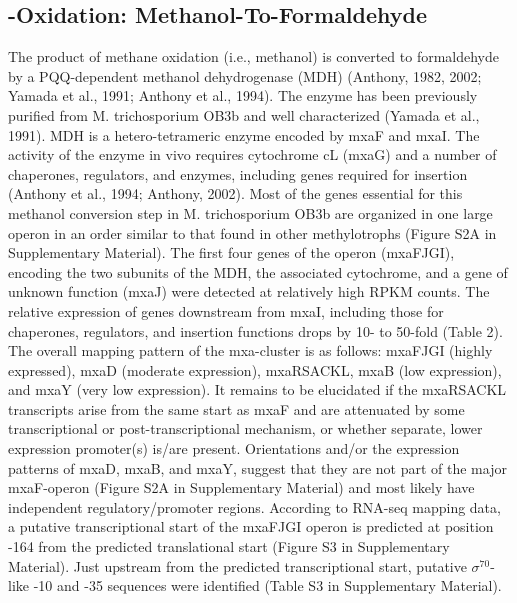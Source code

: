 \subsection{-Oxidation: Methanol-To-Formaldehyde}
The product of methane oxidation (i.e., methanol) is converted to formaldehyde by a PQQ-dependent methanol dehydrogenase (MDH) (Anthony, 1982, 2002; Yamada et al., 1991; Anthony et al., 1994).
The enzyme has been previously purified from M. trichosporium OB3b and well characterized (Yamada et al., 1991).
MDH is a hetero-tetrameric enzyme encoded by mxaF and mxaI.
The activity of the enzyme in vivo requires cytochrome cL (mxaG) and a number of chaperones, regulators, and enzymes, including genes required for  insertion (Anthony et al., 1994; Anthony, 2002).
Most of the genes essential for this methanol conversion step in M. trichosporium OB3b are organized in one large operon in an order similar to that found in other methylotrophs (Figure S2A in Supplementary Material).
The first four genes of the operon (mxaFJGI), encoding the two subunits of the MDH, the associated cytochrome, and a gene of unknown function (mxaJ) were detected at relatively high RPKM counts.
The relative expression of genes downstream from mxaI, including those for chaperones, regulators, and  insertion functions drops by 10- to 50-fold (Table 2).
The overall mapping pattern of the mxa-cluster is as follows: mxaFJGI (highly expressed), mxaD (moderate expression), mxaRSACKL, mxaB (low expression), and mxaY (very low expression).
It remains to be elucidated if the mxaRSACKL transcripts arise from the same start as mxaF and are attenuated by some transcriptional or post-transcriptional mechanism, or whether separate, lower expression promoter(s) is/are present.
Orientations and/or the expression patterns of mxaD, mxaB, and mxaY, suggest that they are not part of the major mxaF-operon (Figure S2A in Supplementary Material) and most likely have independent regulatory/promoter regions.
According to RNA-seq mapping data, a putative transcriptional start of the mxaFJGI operon is predicted at position -164 from the predicted translational start (Figure S3 in Supplementary Material).
Just upstream from the predicted transcriptional start, putative $\sigma^{70}$-like -10 and -35 sequences were identified (Table S3 in Supplementary Material).

